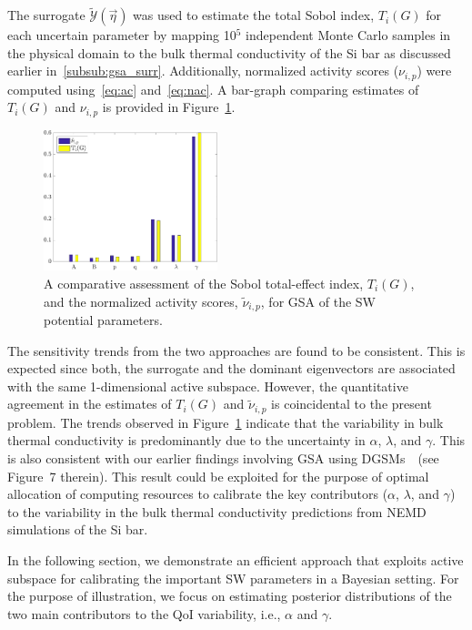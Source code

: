 The surrogate $\tilde{\mathcal{Y}}(\vec{\eta})$ was used to estimate the total Sobol index, $T_i(G)$ for each
uncertain parameter by mapping 10$^5$ independent Monte Carlo samples in the physical domain
to the bulk thermal conductivity of the Si bar as discussed earlier in~\ref{subsub:gsa_surr}. 
Additionally, normalized activity scores ($\nu_{i,p}$) were computed using~\eqref{eq:ac} and~\eqref{eq:nac}.
A bar-graph comparing estimates of $T_i(G)$ and $\nu_{i,p}$ is provided in
Figure~\ref{fig:gsa}. 
%
\begin{figure}[htbp]
\begin{center}
\includegraphics[width=0.45\textwidth]{./Figures/free_as_gsa}
\caption{A comparative assessment of the Sobol total-effect index, $T_i(G)$, and the normalized
activity scores, $\tilde{\nu}_{i,p}$, for GSA of the SW potential parameters.}
\label{fig:gsa}
\end{center}
\end{figure}
%
The sensitivity trends from the two approaches are found to be consistent. This is expected since
both, the surrogate and the dominant eigenvectors are associated with the same 1-dimensional active 
subspace. However, the quantitative agreement in the estimates of $T_i(G)$ and $\tilde{\nu}_{i,p}$
is coincidental to the present problem. The trends observed in Figure~\ref{fig:gsa} indicate
 that the variability in bulk thermal conductivity is predominantly
due to the uncertainty in $\alpha$, $\lambda$, and $\gamma$. This is also consistent with our earlier
findings involving GSA using DGSMs~\cite{Vohra:2018b}~(see Figure~7 therein). 
This result could be exploited for the purpose of optimal allocation of computing resources to calibrate
the key contributors ($\alpha$, $\lambda$, and $\gamma$) to the variability in the bulk thermal conductivity
predictions from NEMD simulations of the Si bar. 

In the following section, we demonstrate an efficient approach that exploits active subspace for 
calibrating the important SW parameters in a Bayesian
setting. For the purpose of illustration, we focus on estimating posterior distributions of
 the two main contributors to the QoI variability, i.e.,
$\alpha$ and $\gamma$. 

